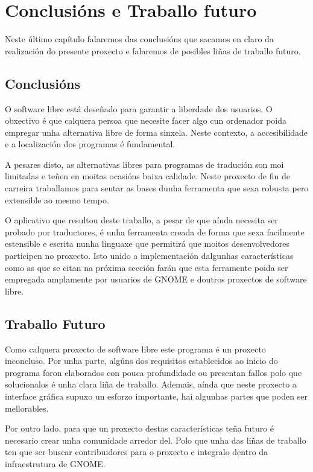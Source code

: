 \chapter{Conclusións e Traballo futuro}

Neste último capítulo falaremos das conclusións que sacamos en claro da realización do presente proxecto e falaremos de posibles liñas de traballo futuro.

\section{Conclusións}
O software libre está deseñado para garantir a liberdade dos usuarios. O obxectivo é que calquera persoa que necesite facer algo cun ordenador poida empregar unha alternativa libre de forma sinxela. Neste contexto, a accesibilidade e a localización dos programas é fundamental.

A pesares disto, as alternativas libres para programas de tradución son moi limitadas e teñen en moitas ocasións baixa calidade. Neste proxecto de fin de carreira traballamos para sentar as bases dunha ferramenta que sexa robusta pero extensible ao mesmo tempo.

O aplicativo que resultou deste traballo, a pesar de que aínda necesita ser probado por traductores, é unha ferramenta creada de forma que sexa facilmente estensible e escrita nunha linguaxe que permitirá que moitos desenvolvedores participen no proxecto. Isto unido a implementación dalgunhas características como as que se citan na próxima sección farán que esta ferramente poida ser empregada amplamente por usuarios de GNOME e doutros proxectos de software libre.

\section{Traballo Futuro}
Como calquera proxecto de software libre este programa é un proxecto inconcluso. Por unha parte, algúns dos requisitos establecidos ao inicio do programa foron elaborados con pouca profundidade ou presentan fallos polo que solucionalos é unha clara liña de traballo. Ademais, aínda que neste proxecto a interface gráfica supuxo un esforzo importante, hai algunhas partes que poden ser mellorables.

Por outro lado, para que un proxecto destas características teña futuro é necesario crear unha comunidade arredor del. Polo que unha das liñas de traballo ten que ser buscar contribuidores para o proxecto e integralo dentro da infraestrutura de GNOME.

